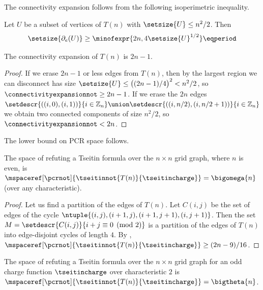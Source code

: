 \documentclass{toc}
\begin{document}
The connectivity expansion follows from the following isoperimetric inequality.
\begin{theorem}
  \label{th:isoperimetric-grid}
  Let $U$ be a subset of vertices of $T(n)$ with $\setsize{U}\leq n^2/2$. Then
  \begin{equation*}
    \setsize{\partial_e(U)}\geq\minofexpr{2n,4\setsize{U}^{1/2}} \eqperiod
  \end{equation*}
\end{theorem}
\begin{corollary}
  The connectivity expansion of $T(n)$ is $2n-1$.
\end{corollary}
\begin{proof}
  If we erase $2n-1$ or less edges from $T(n)$, then by  the largest region we can disconnect has size $\setsize{U}\leq\bigl((2n-1)/4\bigr)^2<n^2/2$, so $\connectivityexpansionnot\geq 2n-1$. If we erase the $2n$ edges $\setdescr{((i, 0), (i, 1))}{i \in \mathbb{Z}_n} \union \setdescr{((i, n / 2), (i, n / 2 + 1))}{i \in \mathbb{Z}_n}$ we obtain two connected components of size $n^2/2$, so $\connectivityexpansionnot<2n$.
\end{proof}

The lower bound on PCR space follows.
\begin{corollary}
  \label{cor:grid-space-lower-bound}
  The space of refuting a Tseitin formula over the $n\times n$ grid
  graph, where $n$ is even, is
  $\mspaceref[\pcrnot]{\tseitinnot{T(n)}{\tseitincharge}}=\bigomega{n}$
  (over any characteristic).
\end{corollary}
\begin{proof}
  Let us find a partition of the edges of $T(n)$. Let $C(i,j)$ be the set of edges of the cycle $\ntuple{(i,j),(i+1,j),(i+1,j+1),(i,j+1)}$. Then the set $M=\setdescr{C(i,j)}{i+j \equiv 0 \pmod{2}}$ is a partition of the edges of $T(n)$ into edge-disjoint cycles of length $4$. By , $\mspaceref[\pcrnot]{\tseitinnot{T(n)}{\tseitincharge}}\geq (2n-9)/16$.
\end{proof}

\begin{theorem} \label{th:grid-space-tight-bound}
  The space of refuting a Tseitin formula over the $n\times n$ grid graph for an odd charge function $\tseitincharge$ over characteristic $2$ is $\mspaceref[\pcrnot]{\tseitinnot{T(n)}{\tseitincharge}}=\bigtheta{n}$.
\end{theorem}
\end{document}
